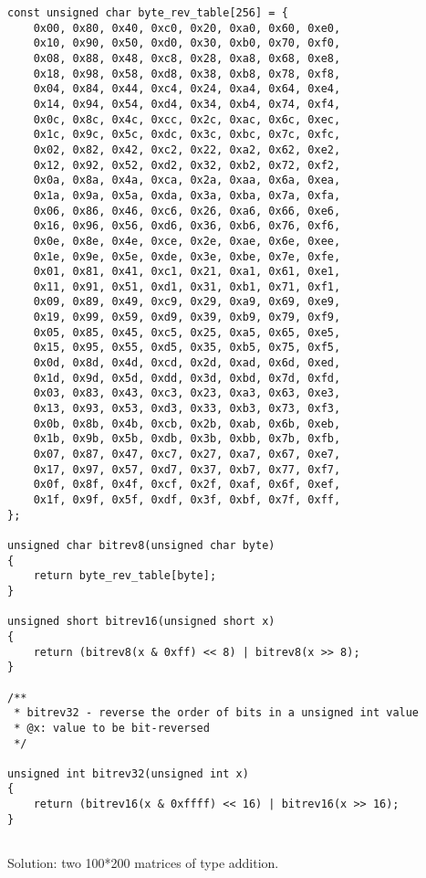 \begin{lstlisting}
const unsigned char byte_rev_table[256] = {
	0x00, 0x80, 0x40, 0xc0, 0x20, 0xa0, 0x60, 0xe0,
	0x10, 0x90, 0x50, 0xd0, 0x30, 0xb0, 0x70, 0xf0,
	0x08, 0x88, 0x48, 0xc8, 0x28, 0xa8, 0x68, 0xe8,
	0x18, 0x98, 0x58, 0xd8, 0x38, 0xb8, 0x78, 0xf8,
	0x04, 0x84, 0x44, 0xc4, 0x24, 0xa4, 0x64, 0xe4,
	0x14, 0x94, 0x54, 0xd4, 0x34, 0xb4, 0x74, 0xf4,
	0x0c, 0x8c, 0x4c, 0xcc, 0x2c, 0xac, 0x6c, 0xec,
	0x1c, 0x9c, 0x5c, 0xdc, 0x3c, 0xbc, 0x7c, 0xfc,
	0x02, 0x82, 0x42, 0xc2, 0x22, 0xa2, 0x62, 0xe2,
	0x12, 0x92, 0x52, 0xd2, 0x32, 0xb2, 0x72, 0xf2,
	0x0a, 0x8a, 0x4a, 0xca, 0x2a, 0xaa, 0x6a, 0xea,
	0x1a, 0x9a, 0x5a, 0xda, 0x3a, 0xba, 0x7a, 0xfa,
	0x06, 0x86, 0x46, 0xc6, 0x26, 0xa6, 0x66, 0xe6,
	0x16, 0x96, 0x56, 0xd6, 0x36, 0xb6, 0x76, 0xf6,
	0x0e, 0x8e, 0x4e, 0xce, 0x2e, 0xae, 0x6e, 0xee,
	0x1e, 0x9e, 0x5e, 0xde, 0x3e, 0xbe, 0x7e, 0xfe,
	0x01, 0x81, 0x41, 0xc1, 0x21, 0xa1, 0x61, 0xe1,
	0x11, 0x91, 0x51, 0xd1, 0x31, 0xb1, 0x71, 0xf1,
	0x09, 0x89, 0x49, 0xc9, 0x29, 0xa9, 0x69, 0xe9,
	0x19, 0x99, 0x59, 0xd9, 0x39, 0xb9, 0x79, 0xf9,
	0x05, 0x85, 0x45, 0xc5, 0x25, 0xa5, 0x65, 0xe5,
	0x15, 0x95, 0x55, 0xd5, 0x35, 0xb5, 0x75, 0xf5,
	0x0d, 0x8d, 0x4d, 0xcd, 0x2d, 0xad, 0x6d, 0xed,
	0x1d, 0x9d, 0x5d, 0xdd, 0x3d, 0xbd, 0x7d, 0xfd,
	0x03, 0x83, 0x43, 0xc3, 0x23, 0xa3, 0x63, 0xe3,
	0x13, 0x93, 0x53, 0xd3, 0x33, 0xb3, 0x73, 0xf3,
	0x0b, 0x8b, 0x4b, 0xcb, 0x2b, 0xab, 0x6b, 0xeb,
	0x1b, 0x9b, 0x5b, 0xdb, 0x3b, 0xbb, 0x7b, 0xfb,
	0x07, 0x87, 0x47, 0xc7, 0x27, 0xa7, 0x67, 0xe7,
	0x17, 0x97, 0x57, 0xd7, 0x37, 0xb7, 0x77, 0xf7,
	0x0f, 0x8f, 0x4f, 0xcf, 0x2f, 0xaf, 0x6f, 0xef,
	0x1f, 0x9f, 0x5f, 0xdf, 0x3f, 0xbf, 0x7f, 0xff,
};

unsigned char bitrev8(unsigned char byte)
{
	return byte_rev_table[byte];
}

unsigned short bitrev16(unsigned short x)
{
	return (bitrev8(x & 0xff) << 8) | bitrev8(x >> 8);
}

/**
 * bitrev32 - reverse the order of bits in a unsigned int value
 * @x: value to be bit-reversed
 */

unsigned int bitrev32(unsigned int x)
{
	return (bitrev16(x & 0xffff) << 16) | bitrev16(x >> 16);
}
\end{lstlisting}

\subsection{}

{Solution: two 100*200 matrices of \Tdouble type addition.}


